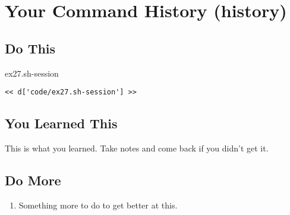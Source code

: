 \chapter{Your Command History (history)}

\section{Do This}

\begin{code}{ex27.sh-session}
\begin{Verbatim}
<< d['code/ex27.sh-session'] >>
\end{Verbatim}
\end{code}


\section{You Learned This}

This is what you learned.  Take notes and come back if you didn't get it.

\section{Do More}

\begin{enumerate}
\item Something more to do to get better at this.
\end{enumerate}

